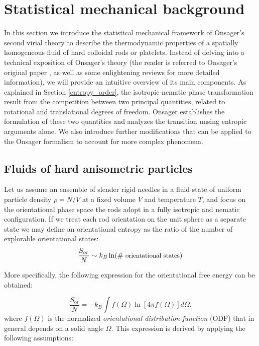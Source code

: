 \section{Statistical mechanical background}

In this section we introduce the statistical mechanical framework of  Onsager's second virial theory to describe the thermodynamic properties of a spatially homogeneous fluid of hard colloidal rods or platelets. Instead of delving into a technical exposition of Onsager's theory (the reader is referred to Onsager's original paper \cite{onsager1949}, as well as some enlightening reviews \cite{Vroege92, allenevans} for more detailed information), we will provide an intuitive overview of its main components. As explained in Section \ref{entropy_order}, the isotropic-nematic phase transformation result from the competition between two principal quantities, related to rotational and translational degrees of freedom. Onsager establishes the formulation of these two quantities and analyzes the transition unsing entropic arguments alone. We also introduce further modifications that can be applied to the Onsager formalism to account for more complex phenomena.

\subsection{Fluids of hard anisometric particles}

Let us assume an ensemble of slender rigid needles in a fluid state of uniform particle density $\rho = N/V$ at a fixed volume $V$ and temperature $T$, and focus on the orientational phase space the rods adopt in a fully isotropic and nematic configuration. If we treat each rod orientation on the unit sphere as a separate state we may define an orientational entropy as the ratio of the number of explorable orientational states:
\begin{equation}
\frac{S_{or}}{N} \sim k_{B} \ln ( \mbox{\# {\small orientational states}})
\label{sor}
\end{equation}

More specifically, the following expression for the orientational free energy can be obtained:

\begin{equation}
\frac{S_{\text{or}}}{N}=-k_B\int f(\Omega)\ln \left[4\pi f(\Omega)\right]d\Omega.
\label{0forient}
\end{equation}
where $f(\Omega)$ is the normalized {\em orientational distribution function} (ODF) that in general depends on a solid angle $\Omega$. This expression is derived by applying the following assumptions:

